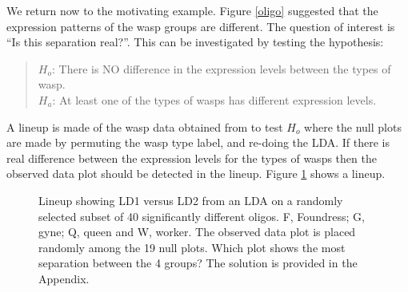 
We return now to the motivating example. Figure \ref{oligo} suggested that the expression patterns of the wasp groups are different.  The question of interest is ``Is this separation real?''. This can be investigated by testing the hypothesis: 

\begin{quote}
$H_o$: There is NO difference in the expression levels between the types of wasp.\\
$H_a$: At least one of the types of wasps has different expression levels.
\end{quote}
A lineup is made of the wasp data obtained from \cite{toth:2010} to test $H_o$ where the null plots are made by permuting the wasp type label, and re-doing the LDA. If there is real difference between the expression levels for the types of wasps then the observed data plot should be detected in the lineup. Figure \ref{toth_lineup} shows a lineup. 

\begin{figure}[hbtp]
   \centering
       \caption{Lineup showing LD1 versus LD2 from an LDA on a randomly selected subset of 40 significantly different oligos. F, Foundress; G, gyne; Q, queen and W, worker. The observed data plot is placed randomly among the 19 null plots. Which plot shows the most separation between the 4 groups? The solution is provided in the Appendix.}
       \label{toth_lineup}
\end{figure} 

